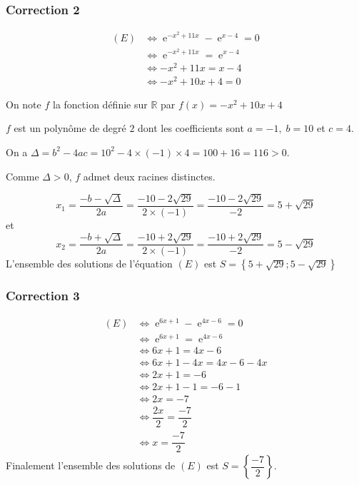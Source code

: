 \documentclass[15pt, mathserif]{beamer}
\DeclareMathOperator{\e}{e}
\newcommand{\R}{\mathbb{R}}			%
\begin{document}
\begin{frame}
\vspace{-10mm}
	\frametitle{Correction 2}
	\begin{align*} (E)& \Leftrightarrow \e^{-x^2+11x}-\e^{x-4}=0 \\
		&\Leftrightarrow \e^{-x^2+11x}=\e^{x-4} \\
		&\Leftrightarrow -x^2+11x=x-4\\
		&\Leftrightarrow -x^2+10x+4=0 
 \end{align*} 
 
 On note $f$ la fonction définie sur $\R$ par $f(x)=-x^2+10x+4$ 
 
 $f$ est un polynôme de degré $2$ dont les coefficients sont $a =-1, \; b =10$ et $c =4$.
 
 On a $\Delta = b^2-4ac =10^2-4 \times\left(-1\right)\times4=100+16 = 116>0$.

 
 \end{frame} 
 
 \begin{frame} 
 

 
 Comme $\Delta > 0$, $f$ admet deux racines distinctes. 

\[x_1 = \dfrac{-b-\sqrt{\Delta}}{2a} = \dfrac{-10-2\sqrt{29}}{2 \times \left(-1\right)} = \dfrac{-10-2\sqrt{29}}{-2}=5+\sqrt{29}\] et \[ x_2 = \dfrac{-b+\sqrt{\Delta}}{2a} = \dfrac{-10+2\sqrt{29}}{2 \times \left(-1\right)} = \dfrac{-10+2\sqrt{29}}{-2}  =5-\sqrt{29}\] L'ensemble des solutions de l'équation $(E)$ est $S=\left\{ 5+\sqrt{29};5-\sqrt{29}\right\}$\end{frame}


\begin{frame}
\vspace{-10mm}
	\frametitle{Correction 3}
	\begin{align*} (E)& \Leftrightarrow \e^{6x+1}-\e^{4x-6}=0 \\
		&\Leftrightarrow \e^{6x+1}=\e^{4x-6} \\
		&\Leftrightarrow 6x+1=4x-6\\
		&\Leftrightarrow 6x+1-4x=4x-6-4x\\
		&\Leftrightarrow 2x+1=-6\\
		&\Leftrightarrow 2x+1-1=-6-1\\
		&\Leftrightarrow 2x=-7\\
		&\Leftrightarrow \dfrac{2x}{2}=\dfrac{-7}{2} \\
		&\Leftrightarrow x= \dfrac{-7}{2}
	\end{align*}
	Finalement l'ensemble des solutions de $(E)$ est $S = \left\{\dfrac{-7}{2}\right\}$.
\end{frame}
\end{document}
